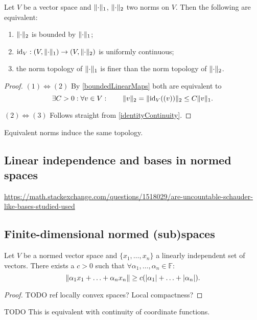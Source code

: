 \begin{proposition} \label{normComparison}
Let $V$ be a vector space and $\lVert\cdot\rVert_1$, $\lVert\cdot\rVert_2$ two norms on $V$. Then the following are equivalent:
\begin{enumerate}
\item $\lVert\cdot\rVert_2$ is bounded by $\lVert\cdot\rVert_1$;
\item $\id_V: \sSet{V,\norm{\cdot}_1} \to \sSet{V,\norm{\cdot}_2}$ is uniformly continuous;
\item the norm topology of $\lVert\cdot\rVert_1$ is finer than the norm topology of $\lVert\cdot\rVert_2$.
\end{enumerate}
\end{proposition}
\begin{proof}
$(1) \Leftrightarrow (2)$ By \ref{boundedLinearMaps} both are equivalent to
\[ \exists C>0: \forall v\in V: \qquad \lVert v\rVert_2 = \lVert\operatorname{id}_V((v))\rVert_2 \leq C\lVert v\rVert_1. \]

$(2) \Leftrightarrow (3)$ Follows straight from \ref{identityContinuity}.
\end{proof}
\begin{corollary}
Equivalent norms induce the same topology.
\end{corollary}




\subsection{Linear independence and bases in normed spaces}
\url{https://math.stackexchange.com/questions/1518029/are-uncountable-schauder-like-bases-studied-used}

\subsection{Finite-dimensional normed (sub)spaces}

\begin{lemma} \label{coordinateContinuity}
Let $V$ be a normed vector space and $\{x_1, \ldots, x_n\}$ a linearly independent set of vectors. There exists a $c>0$ such that $\forall \alpha_1,\ldots, \alpha_n \in \mathbb{F}$:
\[ \lVert\alpha_1x_1 + \ldots + \alpha_nx_n\rVert \geq c(|\alpha_1|+\ldots+|\alpha_n|) . \]
\end{lemma}
\begin{proof}
TODO ref locally convex spaces? Local compactness?
\end{proof}
TODO This is equivalent with continuity of coordinate functions.

